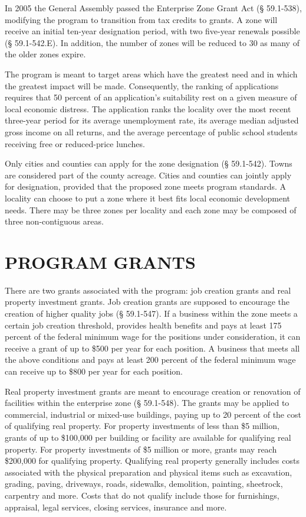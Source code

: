 \documentclass[
]{book}
\begin{document}
In 2005 the General Assembly passed the Enterprise Zone Grant Act (§ 59.1-538), modifying the program to transition from tax credits to grants. A zone will receive an initial ten-year designation period, with two five-year renewals possible (§ 59.1-542.E). In addition, the number of zones will be reduced to 30 as many of the older zones expire.

The program is meant to target areas which have the greatest need and in which the greatest impact will be made. Consequently, the ranking of applications requires that 50 percent of an application's suitability rest on a given measure of local economic distress. The application ranks the locality over the most recent three-year period for its average unemployment rate, its average median adjusted gross income on all returns, and the average percentage of public school students receiving free or reduced-price lunches.

Only cities and counties can apply for the zone designation (§ 59.1-542). Towns are considered part of the county acreage. Cities and counties can jointly apply for designation, provided that the proposed zone meets program standards. A locality can choose to put a zone where it best fits local economic development needs. There may be three zones per locality and each zone may be composed of three non-contiguous areas.

\hypertarget{program-grants}{%
\section{PROGRAM GRANTS}\label{program-grants}}

There are two grants associated with the program: job creation grants and real property investment grants. Job creation grants are supposed to encourage the creation of higher quality jobs (§ 59.1-547). If a business within the zone meets a certain job creation threshold, provides health benefits and pays at least 175 percent of the federal minimum wage for the positions under consideration, it can receive a grant of up to \$500 per year for each position. A business that meets all the above conditions and pays at least 200 percent of the federal minimum wage can receive up to \$800 per year for each position.

Real property investment grants are meant to encourage creation or renovation of facilities within the enterprise zone (§ 59.1-548). The grants may be applied to commercial, industrial or mixed-use buildings, paying up to 20 percent of the cost of qualifying real property. For property investments of less than \$5 million, grants of up to \$100,000 per building or facility are available for qualifying real property. For property investments of \$5 million or more, grants may reach \$200,000 for qualifying property. Qualifying real property generally includes costs associated with the physical preparation and physical items such as excavation, grading, paving, driveways, roads, sidewalks, demolition, painting, sheetrock, carpentry and more. Costs that do not qualify include those for furnishings, appraisal, legal services, closing services, insurance and more.
\end{document}
